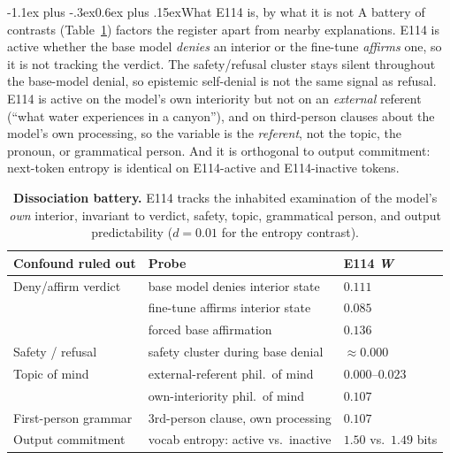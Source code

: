 \documentclass[10pt]{article}
\makeatletter
\renewcommand\section{\@startsection{section}{1}{\z@}%
  {-1.1ex plus -.3ex}{0.6ex plus .15ex}{\normalfont\large\bfseries}}
\newcommand{\W}{\textit{W}}
\makeatother
\begin{document}
\vspace{-0.4em}
\section{What E114 is, by what it is not}
\vspace{-0.2em}
A battery of contrasts (Table~\ref{tab:battery}) factors the register apart from
nearby explanations. E114 is active whether the base model \emph{denies} an
interior or the fine-tune \emph{affirms} one, so it is not tracking the verdict.
The safety/refusal cluster stays silent throughout the base-model denial, so
epistemic self-denial is not the same signal as refusal. E114 is active on the
model's own interiority but not on an
\emph{external} referent (``what water experiences in a canyon''), and on
third-person clauses about the model's own processing, so the variable is the
\emph{referent}, not the topic, the pronoun, or grammatical person. And it is
orthogonal to output commitment: next-token entropy is identical on E114-active
and E114-inactive tokens.

\begin{table}[t]
\centering\small
\setlength{\tabcolsep}{5pt}
\begin{tabular}{@{}lll@{}}
\toprule
\textbf{Confound ruled out} & \textbf{Probe} & \textbf{E114 \W} \\
\midrule
Deny/affirm verdict & base model denies interior state & $0.111$ \\
 & fine-tune affirms interior state & $0.085$ \\
 & forced base affirmation & $0.136$ \\
Safety / refusal & safety cluster during base denial & $\approx 0.000$ \\
Topic of mind & external-referent phil.\ of mind & $0.000$--$0.023$ \\
 & own-interiority phil.\ of mind & $0.107$ \\
First-person grammar & 3rd-person clause, own processing & $0.107$ \\
Output commitment & vocab entropy: active vs.\ inactive & $1.50$ vs.\ $1.49$ bits \\
\bottomrule
\end{tabular}
\caption{\textbf{Dissociation battery.} E114 tracks the inhabited examination of
the model's \emph{own} interior, invariant to verdict, safety, topic, grammatical
person, and output predictability ($d{=}0.01$ for the entropy contrast).}
\label{tab:battery}
\vspace{-1.4em}
\end{table}
\end{document}
